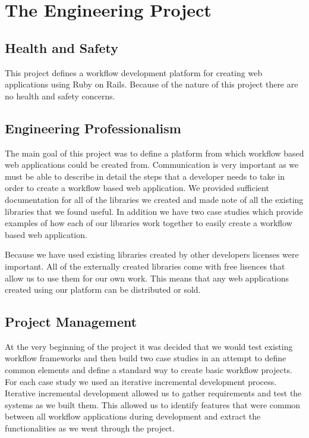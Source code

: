 \documentclass[document.tex]{subfiles}
\begin{document}
\chapter{The Engineering Project}
\label {ch:engineering}

\section{Health and Safety}

This project defines a workflow development platform for creating web applications using Ruby on Rails. Because of the nature of this project there are no health and safety concerns.

\section{Engineering Professionalism}

The main goal of this project was to define a platform from which workflow based web applications could be created from. Communication is very important as we must be able to describe in detail the steps that a developer needs to take in order to create a workflow based web application. We provided sufficient documentation for all of the libraries we created and made note of all the existing libraries that we found useful. In addition we have two case studies which provide examples of how each of our libraries work together to easily create a workflow based web application.

Because we have used existing libraries created by other developers licenses were important. All of the externally created libraries come with free lisences that allow us to use them for our own work. This means that any web applications created using our platform can be distributed or sold.

\section{Project Management}

At the very beginning of the project it was decided that we would test existing workflow frameworks and then build two case studies in an attempt to define common elements and define a standard way to create basic workflow projects. For each case study we used an iterative incremental development process. Iterative incremental development allowed us to gather requirements and test the systems as we built them. This allowed us to identify features that were common between all workflow applications during development and extract the functionalities as we went through the project.
\end{document}
